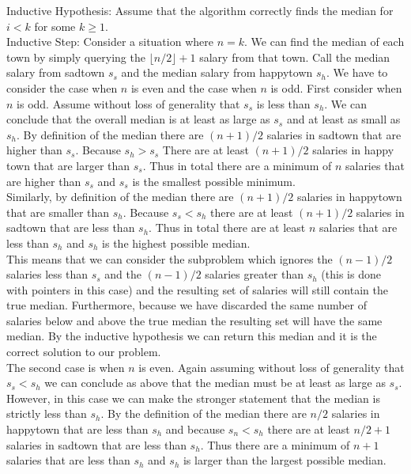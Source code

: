 \documentclass{article}
\begin{document}
Inductive Hypothesis: Assume that the algorithm correctly finds the median for $i < k$ for some $k \ge 1$.\\

Inductive Step: Consider a situation where $n = k$. We can find the median of each town by simply querying the $\lfloor n/2 \rfloor + 1$ salary from that town. Call the median salary from sadtown $s_s$ and the median salary from happytown $s_h$. We have to consider the case when $n$ is even and the case when $n$ is odd. First consider when $n$ is odd. Assume without loss of generality that $s_s$ is less than $s_h$. We can conclude that the overall median is at least as large as $s_s$ and at least as small as $s_h$. By definition of the median there are $(n+1)/2$ salaries in sadtown that are higher than $s_s$. Because $s_h > s_s$ There are at least $(n+1)/2$ salaries in happy town that are larger than $s_s$. Thus in total there are a minimum of $n$ salaries that are higher than $s_s$ and $s_s$ is the smallest possible minimum.\\

Similarly, by definition of the median there are $(n+1)/2$ salaries in happytown that are smaller than $s_h$. Because $s_s < s_h$ there are at least $(n+1)/2$ salaries in sadtown that are less than $s_h$. Thus in total there are at least $n$ salaries that are less than $s_h$ and $s_h$ is the highest possible median.\\

This means that we can consider the subproblem which ignores the $(n-1)/2$ salaries less than $s_s$ and the $(n-1)/2$ salaries greater than $s_h$ (this is done with pointers in this case) and the resulting set of salaries will still contain the true median. Furthermore, because we have discarded the same number of salaries below and above the true median the resulting set will have the same median. By the inductive hypothesis we can return this median and it is the correct solution to our problem.\\

The second case is when $n$ is even. Again assuming without loss of generality that $s_s < s_h$ we can conclude as above that the median must be at least as large as $s_s$. However, in this case we can make the stronger statement that the median is strictly less than $s_h$. By the definition of the median there are $n/2$ salaries in happytown that are less than $s_h$ and because $s_n < s_h$ there are at least $n/2 + 1$ salaries in sadtown that are less than $s_h$. Thus there are a minimum of $n+1$ salaries that are less than $s_h$ and $s_h$ is larger than the largest possible median. \\
\end{document}
